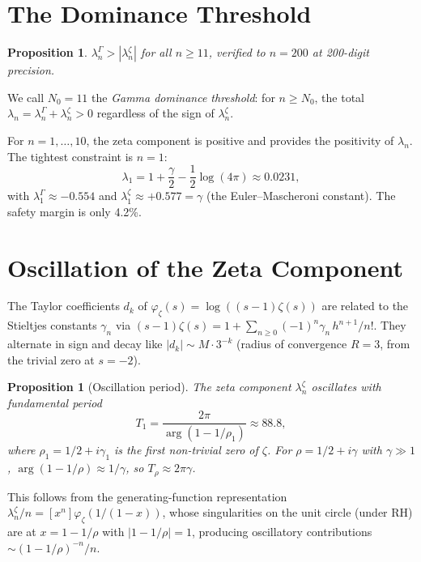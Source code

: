 \documentclass[11pt,a4paper]{article}
\newtheorem{proposition}[theorem]{Proposition}
\newcommand{\Li}{\lambda}
\newcommand{\LiG}{\lambda^{\Gamma}}
\newcommand{\LiZ}{\lambda^{\zeta}}
\begin{document}
\section{The Dominance Threshold}

\begin{proposition}\label{prop:N0}
$\LiG_n > |\LiZ_n|$ for all $n\ge 11$, verified to $n=200$ at
200-digit precision.
\end{proposition}

We call $N_0 = 11$ the \emph{Gamma dominance threshold}: for $n\ge N_0$,
the total $\Li_n = \LiG_n + \LiZ_n > 0$ regardless of the sign of $\LiZ_n$.

For $n = 1,\ldots,10$, the zeta component is positive and provides the
positivity of $\Li_n$. The tightest constraint is $n=1$:
\begin{equation}
  \Li_1 = 1 + \frac{\gamma}{2} - \frac{1}{2}\log(4\pi) \approx 0.0231,
\end{equation}
with $\LiG_1 \approx -0.554$ and $\LiZ_1 \approx +0.577 = \gamma$
(the Euler--Mascheroni constant). The safety margin is only 4.2\%.

\section{Oscillation of the Zeta Component}

The Taylor coefficients $d_k$ of $\varphi_\zeta(s) = \log((s{-}1)\zeta(s))$
are related to the Stieltjes constants $\gamma_n$ via
$(s{-}1)\zeta(s) = 1 + \sum_{n\ge 0}(-1)^n\gamma_n\,h^{n+1}/n!$.
They alternate in sign and decay like $|d_k| \sim M\cdot 3^{-k}$
(radius of convergence $R=3$, from the trivial zero at $s=-2$).

\begin{proposition}[Oscillation period]\label{prop:period}
The zeta component $\LiZ_n$ oscillates with fundamental period
\begin{equation}\label{eq:period}
  T_1 = \frac{2\pi}{\arg(1-1/\rho_1)} \approx 88.8,
\end{equation}
where $\rho_1 = 1/2 + i\gamma_1$ is the first non-trivial zero of $\zeta$.
For $\rho = 1/2+i\gamma$ with $\gamma\gg 1$,
$\arg(1-1/\rho) \approx 1/\gamma$, so $T_\rho \approx 2\pi\gamma$.
\end{proposition}

This follows from the generating-function representation
$\LiZ_n/n = [x^n]\varphi_\zeta(1/(1-x))$, whose singularities on the
unit circle (under RH) are at $x = 1-1/\rho$ with $|1-1/\rho|=1$,
producing oscillatory contributions $\sim (1-1/\rho)^{-n}/n$.
\end{document}
